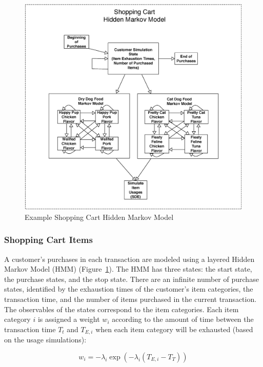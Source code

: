 \documentclass[conference]{IEEEtran}
\begin{document}
\begin{figure}[!t]
  \centering
  \includegraphics[width=6in]{figures/shopping_cart_simulation.eps}
  \caption{Example Shopping Cart Hidden Markov Model}
  \label{fig:shopping_cart_sim}
\end{figure}

\subsubsection{Shopping Cart Items} \label{sec:transaction-purchases}

A customer's purchases in each transaction are modeled using a layered Hidden Markov Model (HMM) (Figure~\ref{fig:shopping_cart_sim}).  The HMM has three states: the start state, the purchase states, and the stop state. There are an infinite number of purchase states, identified by the exhaustion times of the customer's item categories, the transaction time, and the number of items purchased in the current transaction. The observables of the states correspond to the item categories.  Each item category $i$ is assigned a weight $w_i$ according to the amount of time between the transaction time $T_t$ and $T_{E,i}$ when each item category will be exhausted (based on the usage simulations):

\begin{equation}
w_i = - \lambda_i \exp(-\lambda_i (T_{E, i}- T_{T}))
\end{equation}
\end{document}
